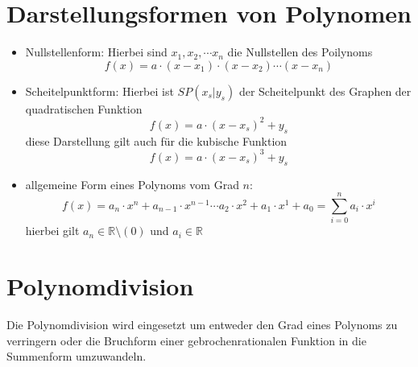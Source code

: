 \section{Darstellungsformen von Polynomen}
\begin{itemize}
    \item Nullstellenform: Hierbei sind $x_1, x_2, \cdots x_n$ die Nullstellen des Poilynoms $$f(x) = a\cdot (x-x_1)\cdot (x-x_2) \cdots (x-x_n)$$
    \item Scheitelpunktform: Hierbei ist $SP(x_s|y_s)$ der Scheitelpunkt des Graphen der quadratischen Funktion $$f(x) = a\cdot (x-x_s)^2 +y_s$$ diese Darstellung gilt auch für die kubische Funktion $$f(x) = a\cdot (x-x_s)^3 +y_s$$ 
    \item allgemeine Form eines Polynoms vom Grad $n$: $$f(x) = a_n\cdot x^n + a_{n-1}\cdot x^{n-1} \cdots a_2\cdot x^2 + a_1\cdot x^1 + a_0 = \sum\limits_{i=0}^{n} a_i\cdot x^i$$ hierbei gilt $a_n \in \mathds{R}\setminus \left(0\right)$ und $a_i \in \mathds{R}$
\end{itemize}
\section{Polynomdivision}
Die Polynomdivision wird eingesetzt um entweder den Grad eines Polynoms zu verringern oder die Bruchform einer gebrochenrationalen Funktion in die Summenform umzuwandeln. 
